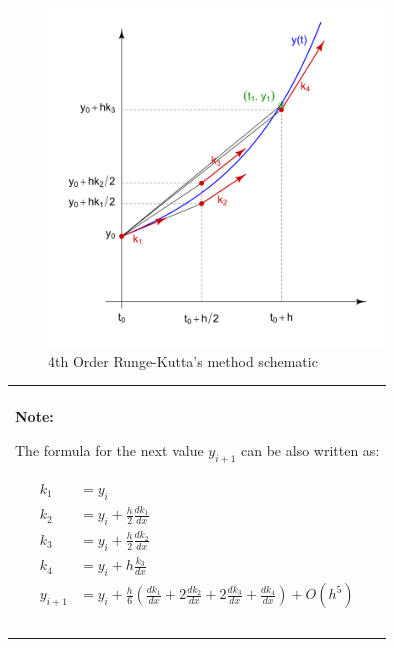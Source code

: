 \documentclass[10pt,b5paper,titlepage]{book}
\newenvironment{bbox}[1][0.96]
{
    \begin{center}
        \begin{tabular}{|p{#1\textwidth}|}
            \hline\\
}
{
            \\\\\hline
        \end{tabular}
    \end{center}
}
\newenvironment{eqarray}
{
    \begin{eqnarray}
        \begin{aligned}
}
{
        \end{aligned}
    \end{eqnarray}
}
\begin{document}
\begin{figure}[ht]
    \centering
    \includegraphics[width=0.80\textwidth]{img/Runge-Kutta_slopes.png}
    \caption{4th Order Runge-Kutta's method schematic}
    \label{fig:rk4-schema-png}
\end{figure}

\newpage
\begin{bbox}[0.96]
\textbf{Note:}

The formula for the next value $ y_{i+1} $ can be also written as:

\begin{eqarray}
    k_1 &= y_i\\
    k_2 &= y_i + \frac{h}{2} \frac{d k_1}{dx}\\
    k_3 &= y_i + \frac{h}{2} \frac{d k_2}{dx}\\
    k_4 &= y_i + h \frac{k_3}{dx}\\
    y_{i+1} &= y_i + \frac{h}{6} (\frac{d k_1}{dx} + 2 \frac{d k_2}{dx}
                              + 2 \frac{d k_3}{dx} + \frac{d k_4}{dx}) + O(h^5)
\end{eqarray}
\end{bbox}
\end{document}
